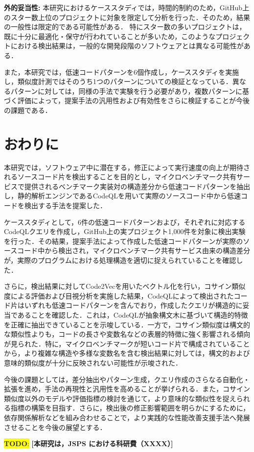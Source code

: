 \documentclass[submit,techrep,noauthor]{ipsj}
\newcommand{\todo}[1]{\colorbox{yellow}{{\bf TODO}:}{\color{red} {\textbf{[#1]}}}}
\begin{document}
\noindent\textbf{外的妥当性: }
本研究におけるケーススタディでは，時間的制約のため，GitHub上のスター数上位のプロジェクトに対象を限定して分析を行った．そのため，結果の一般性は限定的である可能性がある．
特にスター数の多いプロジェクトは，既に十分に最適化・保守が行われていることが多いため，このようなプロジェクトにおける検出結果は，一般的な開発段階のソフトウェアとは異なる可能性がある．

また，本研究では，低速コードパターンを6個作成し，ケーススタディを実施し，類似度計測ではそのうち1つのパターンについての検証となっている．異なるパターンに対しては，同様の手法で実験を行う必要があり，複数パターンに基づく評価によって，提案手法の汎用性および有効性をさらに検証することが今後の課題である．


\section{おわりに}
\label{sec:summary}

本研究では，ソフトウェア中に潜在する，修正によって実行速度の向上が期待されるソースコード片を検出することを目的とし，マイクロベンチマーク共有サービスで提供されるベンチマーク実装対の構造差分から低速コードパターンを抽出し，静的解析エンジンであるCodeQLを用いて実際のソースコード中から低速コードを検出する手法を提案した．

ケーススタディとして，6件の低速コードパターンおよび，それぞれに対応するCodeQLクエリを作成し，GitHub上の実プロジェクト1,000件を対象に検出実験を行った．その結果，提案手法によって作成した低速コードパターンが実際のソースコード中から検出され，マイクロベンチマーク共有サービス由来の構造差分が，実際のプログラムにおける処理構造を適切に捉えられていることを確認した．

さらに，検出結果に対してCode2Vecを用いたベクトル化を行い，コサイン類似度による評価および目視分析を実施した結果，CodeQLによって検出されたコード片はいずれも低速コードパターンを含んでおり，作成したクエリが構造的に妥当であることを確認した．これは，CodeQLが抽象構文木に基づいて構造的特徴を正確に抽出できていることを示唆している．一方で，コサイン類似度は構文的な類似性よりも，コードの長さや変数名などの表層的特徴に強く影響される傾向が見られた．特に，マイクロベンチマークが短いコード片で構成されていることから，より複雑な構造や多様な変数名を含む検出結果に対しては，構文的および意味的類似度が十分に反映されない可能性が示唆された．

今後の課題としては，差分抽出やパターン生成，クエリ作成のさらなる自動化・拡張を進め，手法の再現性と汎用性を高めることが挙げられる．また，コサイン類似度以外のモデルや評価指標の検討を通じて，より意味的な類似性を捉えられる指標の構築を目指す．さらに，検出後の修正影響範囲を明らかにするために，依存関係解析などを組み合わせることで，より実践的な性能改善支援手法へ発展させることを今後の展望とする．

\begin{acknowledgment}
\todo{本研究は，JSPS における科研費（XXXX）}
\end{acknowledgment}





\end{document}
